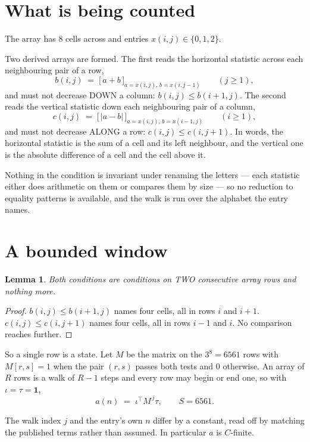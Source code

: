 \documentclass[11pt,a4paper]{article}
\theoremstyle{plain}
\newtheorem{lemma}[theorem]{Lemma}
\theoremstyle{definition}
\begin{document}
\section{What is being counted}

The array has $8$ cells across and entries $x(i,j)\in\{0,1,2\}$.

Two derived arrays are formed. The first reads the horizontal statistic across each
neighbouring pair of a row,
\[
b(i,j)\;=\;\bigl[\,a+b\,\bigr]_{a=x(i,j),\,b=x(i,j-1)}\qquad (j\ge1),
\]
and must not decrease DOWN a column: $b(i,j)\le b(i{+}1,j)$. The second reads the vertical
statistic down each neighbouring pair of a column,
\[
c(i,j)\;=\;\bigl[\,\lvert a-b\rvert\,\bigr]_{a=x(i,j),\,b=x(i{-}1,j)}\qquad (i\ge1),
\]
and must not decrease ALONG a row: $c(i,j)\le c(i,j{+}1)$. In words, the horizontal statistic
is the sum of a cell and its left neighbour, and the vertical one is
the absolute difference of a cell and the cell above it.

Nothing in the condition is invariant under renaming the letters --- each statistic either does
arithmetic on them or compares them by size --- so no reduction to equality patterns is
available, and the walk is run over the alphabet the entry names.

\section{A bounded window}

\begin{lemma}\label{lem:win}
Both conditions are conditions on TWO consecutive array rows and nothing more.
\end{lemma}

\begin{proof}
$b(i,j)\le b(i{+}1,j)$ names four cells, all in rows $i$ and $i+1$. $c(i,j)\le c(i,j{+}1)$
names four cells, all in rows $i-1$ and $i$. No comparison reaches further.
\end{proof}

So a single row is a state. Let $M$ be the matrix on the $3^{8}=6561$ rows with
$M[r,s]=1$ when the pair $(r,s)$ passes both tests and $0$ otherwise. An array of $R$ rows is a
walk of $R-1$ steps and every row may begin or end one, so with $\iota=\tau=\mathbf{1}$,
\[
a(n)\;=\;\iota^{\!\top}M^{\,j}\tau ,\qquad S=6561.
\]

The walk index $j$ and the entry's own $n$ differ by a constant, read off by matching the
published terms rather than assumed. In particular $a$ is $C$-finite.
\end{document}
